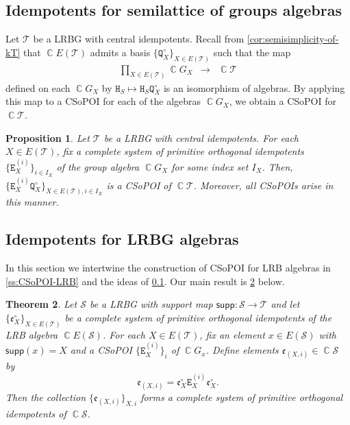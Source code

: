 \documentclass[11pt, oneside, reqno]{amsart}
\newtheorem{theorem}{Theorem}[section]
\newtheorem{prop}[theorem]{Proposition}
\theoremstyle{definition}
\numberwithin{equation}{section}
\DeclareMathOperator{\C}{\mathbb{C}}
\def \SS{{\mathcal{S}}}
\def \TT{{\mathcal{T}}}
\def \kk{\C}
\def \ee{{\mathfrak{e}}}
\def \supp{\mathsf{supp}}
\newcommand{\B}[1]{\mathtt{#1}} 			%
\begin{document}
\subsection{Idempotents for semilattice of groups algebras}\label{ss:idemp-lat-gps}

Let $\TT$ be a LRBG with central idempotents.
Recall from \cref{cor:semisimplicity-of-kT} that
$\kk E(\TT)$ admits a basis $\{ \B{Q}^\circ_{X} \}_{X \in E(\TT)}$
such that the map
\begin{eqnarray*}
    \prod_{X \in E(\TT)} \kk G_{X}
    & \xrightarrow{} &
    \kk \TT
\end{eqnarray*}
defined on each $\kk G_{X}$ by $\B{H}_{S} \mapsto \B{H}_{S} \B{Q}^\circ_{X}$ is an
isomorphism of algebras.
By applying this map to a CSoPOI for each of the algebras $\kk G_{X}$,
we obtain a CSoPOI for $\kk \TT$.

\begin{prop}\label{prop:CSoPOI-SemLatGps}
    Let $\TT$ be a LRBG with central idempotents.
    For each $X \in E(\TT)$, fix a complete system of primitive orthogonal idempotents
    $\{ \B{E}_X^{(i)} \}_{i \in I_{X}}$ of the group algebra $\kk G_X$ for some index set $I_{X}$.
    Then, $\{ \B{E}_X^{(i)} \B{Q}^\circ_X \}_{X \in E(\TT), i \in I_{X}}$ is a CSoPOI of $\kk \TT$.
    Moreover, all CSoPOIs arise in this manner.
\end{prop}

\subsection{Idempotents for LRBG algebras}

In this section we intertwine the construction of CSoPOI for LRB algebras in
\cref{ss:CSoPOI-LRB} and the ideas of \cref{ss:idemp-lat-gps}. Our main result is \cref{thm:CSoPOI-LRBG} below.

\begin{theorem}\label{thm:CSoPOI-LRBG}
    Let $\SS$ be a LRBG with support map $\supp: \SS \to \TT$
    and let $\{ \ee^\circ_X \}_{X \in E(\TT)}$ be a complete system of primitive orthogonal idempotents
    of the LRB algebra $\kk E(\SS)$.
    For each $X \in E(\TT)$,
    fix an element $x \in E(\SS)$ with $\supp(x) = X$ and
    a CSoPOI $\{ \B{E}^{(i)}_X \}_{i}$ of $\kk G_x$.
    Define elements $\ee_{(X,i)} \in \kk \SS$ by
    \[
        \ee_{(X,i)} = \ee^\circ_X \B{E}^{(i)}_X \ee^\circ_X.
    \]
    Then the collection $\{ \ee_{(X,i)} \}_{X,i}$ forms a complete system of primitive orthogonal idempotents
    of $\kk \SS$.
\end{theorem}
\end{document}
